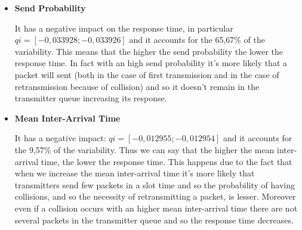 \begin{itemize}
	\item \textbf{Send Probability}
	
	\noindent It has a negative impact on the response time, in particular $qi = [-0,033928; -0,033926]$ and it accounts for the 65,67\% of the variability. This means that the higher the send probability the lower the response time. In fact with an high send probability it's more likely that a packet will sent (both in the case of first transmission and in the case of retransmission because of collision) and so it doesn't remain in the transmitter queue increasing its response.  
	
	\item \textbf{Mean Inter-Arrival Time}
	
	\noindent It has a negative impact: $qi = [-0,012955; -0,012954]$ and it accounts for the 9,57\% of the variability. Thus we can say that the higher the mean inter-arrival time, the lower the response time. This happens due to the fact that when we increase the mean inter-arrival time it's more likely that transmitters send few packets in a slot time and so the probability of having collisions, and so the necessity of retransmitting a packet, is lesser. Moreover even if a collision occurs with an higher mean inter-arrival time there are not several packets in the transmitter queue and so the response time decreases. 
\end{itemize}

\newpage
